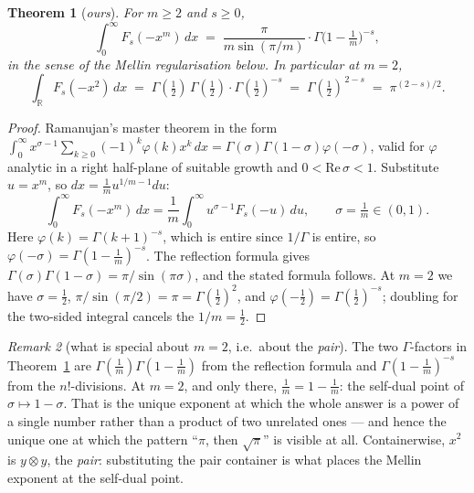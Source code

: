\documentclass[11pt,a4paper]{article}
\newtheorem{theorem}{Theorem}[section]
\theoremstyle{definition}
\theoremstyle{remark}
\newtheorem{remark}[theorem]{Remark}
\newcommand{\RR}{\mathbb{R}}
\begin{document}
\begin{theorem}[\emph{ours}]\label{thm:main}
For $m \ge 2$ and $s \ge 0$,
\[
  \int_0^\infty F_s(-x^m)\,dx
  \;=\; \frac{\pi}{m\sin(\pi/m)}\cdot\Gamma\!\bigl(1 - \tfrac1m\bigr)^{-s},
\]
in the sense of the Mellin regularisation below. In particular at $m = 2$,
\[
  \boxed{\;\int_{\RR} F_s(-x^2)\,dx \;=\; \Gamma(\tfrac12)\,\Gamma(\tfrac12)\cdot\Gamma(\tfrac12)^{-s}
  \;=\; \Gamma(\tfrac12)^{\,2-s} \;=\; \pi^{(2-s)/2}.\;}
\]
\end{theorem}

\begin{proof}
Ramanujan's master theorem in the form
$\int_0^\infty x^{\sigma-1}\sum_{k\ge0}(-1)^k\varphi(k)x^k\,dx = \Gamma(\sigma)\Gamma(1-\sigma)\varphi(-\sigma)$,
valid for $\varphi$ analytic in a right half-plane of suitable growth and
$0 < \mathrm{Re}\,\sigma < 1$. Substitute $u = x^m$, so $dx = \tfrac1m u^{1/m-1}du$:
\[
  \int_0^\infty F_s(-x^m)\,dx = \frac1m\int_0^\infty u^{\sigma-1}F_s(-u)\,du,
  \qquad \sigma = \tfrac1m \in (0,1).
\]
Here $\varphi(k) = \Gamma(k+1)^{-s}$, which is entire since $1/\Gamma$ is entire, so
$\varphi(-\sigma) = \Gamma(1-\tfrac1m)^{-s}$. The reflection formula gives
$\Gamma(\sigma)\Gamma(1-\sigma) = \pi/\sin(\pi\sigma)$, and the stated formula follows.
At $m = 2$ we have $\sigma = \tfrac12$, $\pi/\sin(\pi/2) = \pi = \Gamma(\tfrac12)^2$,
and $\varphi(-\tfrac12) = \Gamma(\tfrac12)^{-s}$; doubling for the two-sided integral
cancels the $1/m = \tfrac12$.
\end{proof}

\begin{remark}[what is special about $m = 2$, i.e.\ about the \emph{pair}]\label{rem:m2}
The two $\Gamma$-factors in Theorem~\ref{thm:main} are $\Gamma(\tfrac1m)\Gamma(1-\tfrac1m)$
from the reflection formula and $\Gamma(1-\tfrac1m)^{-s}$ from the $n!$-divisions.
At $m = 2$, and only there, $\tfrac1m = 1 - \tfrac1m$: the self-dual point of
$\sigma \mapsto 1-\sigma$. That is the unique exponent at which the whole answer is a
power of a single number rather than a product of two unrelated ones --- and hence
the unique one at which the pattern ``$\pi$, then $\sqrt{\pi}$'' is visible at all.
Containerwise, $x^2$ is $y \otimes y$, the \emph{pair}: substituting the pair container
is what places the Mellin exponent at the self-dual point.
\end{remark}
\end{document}
